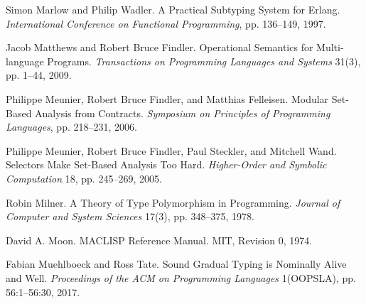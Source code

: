 \documentclass[screen=true, 10pt, acmsmall]{acmart}
\newenvironment{SingleColumn}{\begin{list}{}{\topsep=0pt\partopsep=0pt%
\listparindent=0pt\itemindent=0pt\labelwidth=0pt\leftmargin=0pt\rightmargin=0pt%
\itemsep=0pt\parsep=0pt}\item}{\end{list}}
\newenvironment{AutoBibliography}{\begin{small}}{\end{small}}
\newcommand{\Autobibentry}[1]{\hspace{0.05\linewidth}\parbox[t]{0.95\linewidth}{\parindent=-0.05\linewidth#1\vspace{1.0ex}}}
\begin{document}
\begin{AutoBibliography}
\begin{SingleColumn}
\label{t:x28autobib_x22Simon_Marlow_and_Philip_WadlerA_Practical_Subtyping_System_for_ErlangInternational_Conference_on_Functional_Programmingx2c_ppx2e_136x2dx2d1491997x22x29}\Autobibentry{Simon Marlow and Philip Wadler. A Practical Subtyping System for Erlang. \textit{International Conference on Functional Programming}, pp. 136{--}149, 1997.}

\label{t:x28autobib_x22Jacob_Matthews_and_Robert_Bruce_FindlerOperational_Semantics_for_Multix2dlanguage_ProgramsTransactions_on_Programming_Languages_and_Systems_31x283x29x2c_ppx2e_1x2dx2d442009x22x29}\Autobibentry{Jacob Matthews and Robert Bruce Findler. Operational Semantics for Multi{-}language Programs. \textit{Transactions on Programming Languages and Systems} 31(3), pp. 1{--}44, 2009.}

\label{t:x28autobib_x22Philippe_Meunierx2c_Robert_Bruce_Findlerx2c_and_Matthias_FelleisenModular_Setx2dBased_Analysis_from_ContractsSymposium_on_Principles_of_Programming_Languagesx2c_ppx2e_218x2dx2d2312006x22x29}\Autobibentry{Philippe Meunier, Robert Bruce Findler, and Matthias Felleisen. Modular Set{-}Based Analysis from Contracts. \textit{Symposium on Principles of Programming Languages}, pp. 218{--}231, 2006.}

\label{t:x28autobib_x22Philippe_Meunierx2c_Robert_Bruce_Findlerx2c_Paul_Stecklerx2c_and_Mitchell_WandSelectors_Make_Setx2dBased_Analysis_Too_HardHigherx2dOrder_and_Symbolic_Computation_18x2c_ppx2e_245x2dx2d2692005x22x29}\Autobibentry{Philippe Meunier, Robert Bruce Findler, Paul Steckler, and Mitchell Wand. Selectors Make Set{-}Based Analysis Too Hard. \textit{Higher{-}Order and Symbolic Computation} 18, pp. 245{--}269, 2005.}

\label{t:x28autobib_x22Robin_MilnerA_Theory_of_Type_Polymorphism_in_ProgrammingJournal_of_Computer_and_System_Sciences_17x283x29x2c_ppx2e_348x2dx2d3751978x22x29}\Autobibentry{Robin Milner. A Theory of Type Polymorphism in Programming. \textit{Journal of Computer and System Sciences} 17(3), pp. 348{--}375, 1978.}

\label{t:x28autobib_x22David_Ax2e_MoonMACLISP_Reference_ManualMITx2c_Revision_01974x22x29}\Autobibentry{David A. Moon. MACLISP Reference Manual. MIT, Revision 0, 1974.}

\label{t:x28autobib_x22Fabian_Muehlboeck_and_Ross_TateSound_Gradual_Typing_is_Nominally_Alive_and_WellProceedings_of_the_ACM_on_Programming_Languages_1x28OOPSLAx29x2c_ppx2e_56x3a1x2dx2d56x3a302017x22x29}\Autobibentry{Fabian Muehlboeck and Ross Tate. Sound Gradual Typing is Nominally Alive and Well. \textit{Proceedings of the ACM on Programming Languages} 1(OOPSLA), pp. 56:1{--}56:30, 2017.}


\end{SingleColumn}
\end{AutoBibliography}
\end{document}
